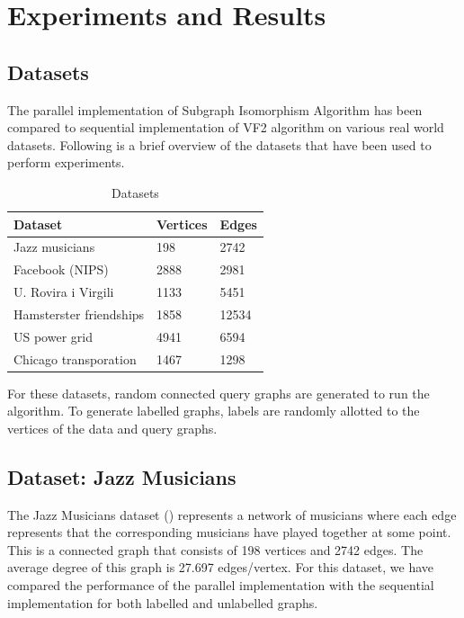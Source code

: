 \chapter{Experiments and Results}
\label{chap:exp}
 
\section{Datasets}

The parallel implementation of Subgraph Isomorphism Algorithm has been compared to sequential implementation of VF2 algorithm on various real world datasets. Following is a brief overview of the datasets that have been used to perform experiments.

\begin{table}[h!]
  \begin{center}
    \caption{Datasets}
    \label{tab:table1}
    \begin{tabular}{l||l|l} %
      \textbf{Dataset} & \textbf{Vertices} & \textbf{Edges}\\
      \hline
      Jazz musicians & 198 & 2742\\
      Facebook (NIPS) & 2888 & 2981\\
      	U. Rovira i Virgili & 1133 & 5451\\
      	Hamsterster friendships & 1858 & 12534\\
      	US power grid & 4941 & 6594\\
      	Chicago transporation & 1467 & 1298
    \end{tabular}
  \end{center}
\end{table}

For these datasets, random connected query graphs are generated to run the algorithm. To generate labelled graphs, labels are randomly allotted to the vertices of the data and query graphs.

\section{Dataset: Jazz Musicians}

The Jazz Musicians dataset (\cite{jazz}) represents a network of musicians where each edge represents that the corresponding musicians have played together at some point. This is a connected graph that consists of 198 vertices and 2742 edges. The average degree of this graph is 27.697 edges/vertex. For this dataset, we have compared the performance of the parallel implementation with the sequential implementation for both labelled and unlabelled graphs.

